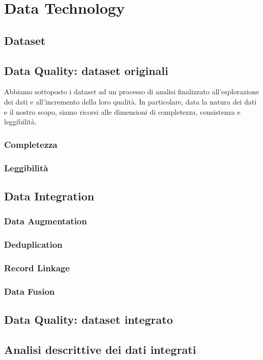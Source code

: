 \setcounter{chapter}{0}

\part{Data Technology}

\chapter{Dataset}

\chapter{Data Quality: dataset originali}
\label{chap:data-quality}
Abbiamo sottoposto i dataset ad un processo di analisi finalizzato 
all'esplorazione dei dati e all'incremento della loro qualità. In particolare, 
data la natura dei dati e il nostro scopo, siamo ricorsi alle dimensioni di 
completezza, consistenza e leggibilità.

\section{Completezza}

\section{Leggibilità}

\chapter{Data Integration}
\label{chap:data-integration}

\section{Data Augmentation}

\section{Deduplication}

\section{Record Linkage}
\label{sec:record-linkage}

\section{Data Fusion}
\label{sec:data-fusion}

\chapter{Data Quality: dataset integrato}

\chapter{Analisi descrittive dei dati integrati}
